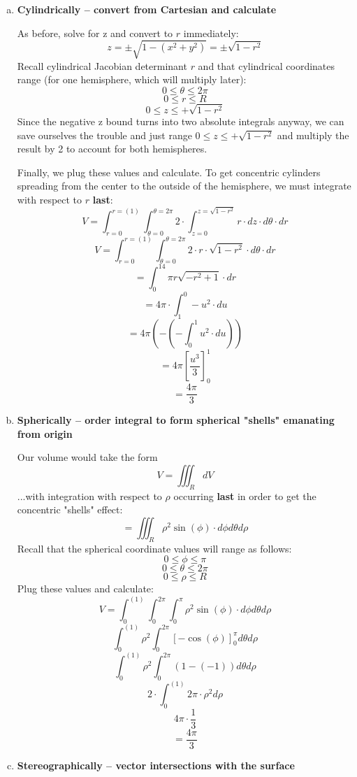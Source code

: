 \documentclass{article}
\begin{document}
\begin{enumerate}[a.]
	\item \textbf{Cylindrically -- convert from Cartesian and calculate}

	    As before, solve for z and convert to $r$ immediately:
	    \[ z=\pm\sqrt{1-(x^2+y^2)} = \pm\sqrt{1-r^2}\]
        Recall cylindrical Jacobian determinant $ r $ and that cylindrical coordinates range (for one hemisphere, which will multiply later):
        \[0 \leq \theta \leq 2\pi \]
        \[0 \leq r \leq R \]
        \[0 \leq z \leq +\sqrt{1-r^2}\]
        Since the negative z bound turns into two absolute integrals anyway, we can save ourselves the trouble and just range $0 \leq z \leq +\sqrt{1-r^2}$ and multiply the result by 2 to account for both hemispheres.

        Finally, we plug these values and calculate. To get concentric cylinders spreading from the center to the outside of the hemisphere, we must integrate with respect to $r$ \textbf{last}:
        \[ V = \int_{r = 0}^{r = (1)} \int_{\theta = 0}^{\theta = 2\pi} 2\cdot\int_{z = 0}^{z = \sqrt{1-r^2}} r \cdot dz \cdot d\theta \cdot dr \]
        \[ V = \int_{r = 0}^{r = (1)} \int_{\theta = 0}^{\theta = 2\pi} 2\cdot r \cdot \sqrt{1-r^2} \cdot d\theta \cdot dr \]
        \[=\int _0^14\pi r\sqrt{-r^2+1} \cdot dr\]
        \[=4\pi \cdot \int _1^0-u^2 \cdot du\]
        \[=4\pi \left(-\left(-\int _0^1u^2 \cdot du\right)\right)\]
        \[=4\pi \left[\frac{u^3}{3}\right]^1_0\]
        \[=\frac{4\pi }{3} \]

	\item \textbf{Spherically -- order integral to form spherical "shells" emanating from origin}

        Our volume would take the form
        \[ V = \iiint_{R}dV \]
        ...with integration with respect to $\rho$ occurring \textbf{last} in order to get the concentric "shells" effect:
        \[ = \iiint_{R}\rho^2\sin(\phi) \cdot d\phi d\theta d\rho \]
        Recall that the spherical coordinate values will range as follows:
        \[ 0 \leq \phi \leq \pi  \]
        \[ 0 \leq \theta \leq 2\pi  \]
        \[ 0 \leq \rho \leq R \]
        Plug these values and calculate:
        \[ V = \int_{0}^{(1)}\int_{0}^{2\pi}\int_{0}^{\pi}\rho^2\sin(\phi) \cdot d\phi d\theta d\rho \]
        \[ \int_{0}^{(1)}\rho^2\int_{0}^{2\pi} \left[-\cos \left(\phi\right)\right]_0^{\pi } d\theta d\rho \]
        \[ \int_{0}^{(1)}\rho^2\int_{0}^{2\pi} (1-\left(-1\right)) d\theta d\rho \]
        \[ 2 \cdot \int_{0}^{(1)} 2\pi \cdot \rho^2 d\rho \]
        \[ 4\pi \cdot \frac{1}{3} \]
        \[ = \frac{4\pi}{3} \]

	\item \textbf{Stereographically -- vector intersections with the surface}
\end{enumerate}
\end{document}
